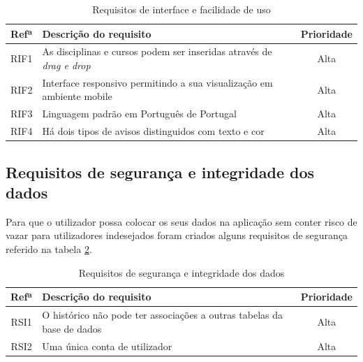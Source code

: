 \documentclass[11pt, twoside]{report}
\begin{document}
	\begin{table}[H]
	\caption{Requisitos de interface e facilidade de uso}
	
	\begin{center}
		\begin{tabularx}{\textwidth}{|c|X|c|}
			\hline
			\textbf{Refª }	& \textbf{Descrição do requisito} & \textbf{Prioridade} \\
			\hline
			RIF1 & As disciplinas e cursos podem ser inseridas através de \textit{drag e drop} &Alta\\
			\hline
			RIF2 & Interface responsivo permitindo a sua visualização em ambiente mobile &Alta\\
			\hline
			RIF3 & Linguagem padrão em Português de Portugal &Alta\\
			\hline
			RIF4 & Há dois tipos de avisos distinguidos com texto e cor &Alta\\
			\hline
		\end{tabularx}
		\label{requisitosdeinterface}
	\end{center}
	\end{table}

	\subsection{Requisitos de segurança e integridade dos dados}
	
	Para que o utilizador possa colocar os seus dados na aplicação sem conter risco de vazar para utilizadores indesejados foram criados alguns requisitos de segurança referido na	tabela \ref{requisitosdeseguranca}.
	
\begin{table}[H]	
	\caption{Requisitos de segurança e integridade dos dados}
	
	
	\begin{center}
		\begin{tabularx}{\textwidth}{|c|X|c|}
			\hline
			\textbf{Refª }	& \textbf{Descrição do requisito} & \textbf{Prioridade} \\
			\hline
			RSI1 &O histórico não pode ter associações a outras tabelas da base de dados  &Alta\\
			\hline
			RSI2 & Uma única conta de utilizador&Alta\\
			\hline
		\end{tabularx}
		\label{requisitosdeseguranca}
	\end{center}
\end{table}
\end{document}
